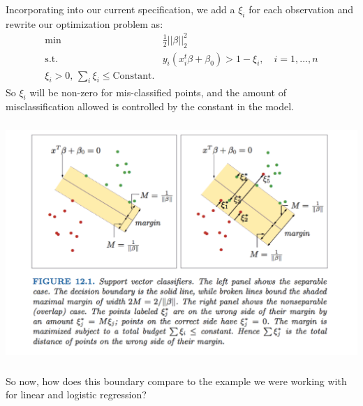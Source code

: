 \documentclass[xetex,mathserif,serif,aspectratio=169]{beamer}
\begin{document}
\begin{frame}[fragile] \frametitle{} \oldB \small

Incorporating into our current specification, we add a $\xi_i$ for each
observation and rewrite our optimization problem as:
\begin{align*}
\min \quad &  \frac{1}{2} || \beta ||_2^2 \\
\text{s.t.} \quad & y_i (x_i^t \beta + \beta_0) > 1 - \xi_i, \quad i = 1, \ldots, n \\
\xi_i > 0, \, \sum_i \xi_i \leq \text{Constant}.
\end{align*}
So $\xi_i$ will be non-zero for mis-classified points, and the amount of
misclassification allowed is controlled by the constant in the model.

\end{frame}

\begin{frame}[fragile] \frametitle{} \oldB \small

\begin{center}
\includegraphics[height=0.7\textheight]{img/slack.pdf}
\end{center}

\end{frame}

\begin{frame}[fragile] \frametitle{} \oldB \small

\textbf{}

So now, how does this boundary compare to the example we were working with
for linear and logistic regression?

\end{frame}
\end{document}
